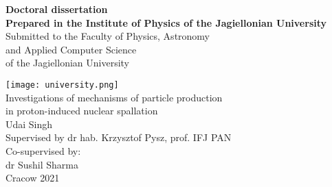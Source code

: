 \begin{titlepage}
	\begin{center}
		\vspace*{1cm}
		\textbf{\Large Doctoral dissertation}\\[0.5cm]	
		\textbf{Prepared in the Institute of Physics
			of the Jagiellonian University}\\[0.5cm]	
		Submitted to the Faculty of Physics,
		Astronomy \\
		and Applied Computer Science \\
		of the Jagiellonian University

		\vspace{1.0cm}
		{\texttt{[image: university.png]}}	\\
		\vspace{1.0cm}
		{\Large Investigations of mechanisms of particle production \\ 
		in proton-induced nuclear spallation }\\
		\vspace{0.5cm}
		\Large Udai Singh\\
		\vspace{0.5cm}
		\large Supervised by
		dr hab. Krzysztof Pysz, prof. IFJ PAN\\
		\vspace{0.5cm}
		Co-supervised by:\\
		dr Sushil Sharma\\
			\vfill
		Cracow 2021
	\end{center}
\end{titlepage}